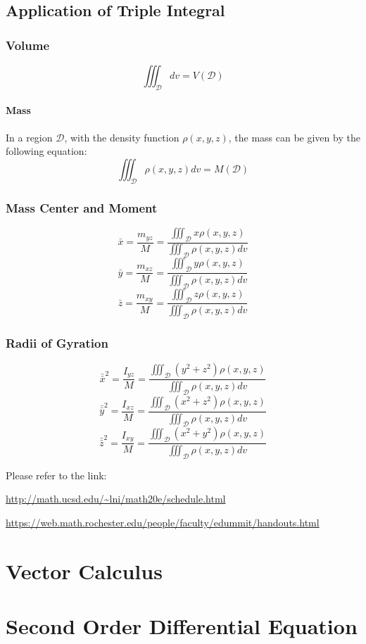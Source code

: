 \documentclass[UTF8,a4paper, 10pt, openany]{svmono}
\begin{document}
\section{Application of Triple Integral}

\subsection{Volume}
$$\iiint_{\mathcal{D}}dv=V(\mathcal{D})$$
\subsubsection{Mass}
In a region $\mathcal{D}$, with the density function $\rho (x,y,z)$, the mass can be given by the following equation:
$$\iiint_{\mathcal{D}}\rho (x,y,z)dv=M(\mathcal{D})$$

\subsection{Mass Center and Moment}
$$\bar{x}=\frac{m_{yz}}{M}=\frac{\displaystyle\iiint_{\mathcal{D}}x\rho(x,y,z)}{\displaystyle\iiint_{\mathcal{D}}\rho (x,y,z)dv}$$
$$\bar{y}=\frac{m_{xz}}{M}=\frac{\displaystyle\iiint_{\mathcal{D}}y\rho(x,y,z)}{\displaystyle\iiint_{\mathcal{D}}\rho (x,y,z)dv}$$
$$\bar{z}=\frac{m_{xy}}{M}=\frac{\displaystyle\iiint_{\mathcal{D}}z\rho(x,y,z)}{\displaystyle\iiint_{\mathcal{D}}\rho (x,y,z)dv}$$

\subsection{Radii of Gyration}
$$\bar{\bar{x}}^2=\frac{I_{yz}}{M}=\frac{\displaystyle\iiint_{\mathcal{D}}(y^2+z^2)\rho(x,y,z)}{\displaystyle\iiint_{\mathcal{D}}\rho (x,y,z)dv}$$
$$\bar{\bar{y}}^2=\frac{I_{xz}}{M}=\frac{\displaystyle\iiint_{\mathcal{D}}(x^2+z^2)\rho(x,y,z)}{\displaystyle\iiint_{\mathcal{D}}\rho (x,y,z)dv}$$
$$\bar{\bar{z}}^2=\frac{I_{xy}}{M}=\frac{\displaystyle\iiint_{\mathcal{D}}(x^2+y^2)\rho(x,y,z)}{\displaystyle\iiint_{\mathcal{D}}\rho (x,y,z)dv}$$

Please refer to the link:

\url{http://math.ucsd.edu/~lni/math20e/schedule.html}

\url{https://web.math.rochester.edu/people/faculty/edummit/handouts.html}

\chapter{Vector Calculus}
\chapter{Second Order Differential Equation}

\appendix %

\printnotes*
\end{document}
